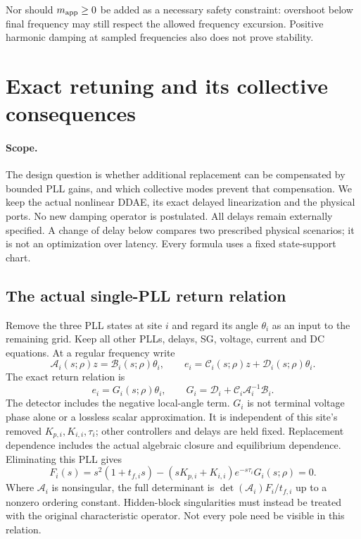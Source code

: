 \documentclass[11pt]{article}
\begin{document}
Nor should $m_{\rm app}\geq0$ be added as a necessary safety
constraint: overshoot below final frequency may still respect the
allowed frequency excursion. Positive harmonic damping at sampled
frequencies also does not prove stability.

\section{Exact retuning and its collective consequences}\label{sec:retuning}

\paragraph{Scope.}
The design question is whether additional replacement can be compensated
by bounded PLL gains, and which collective modes prevent that compensation.
We keep the actual nonlinear DDAE, its exact delayed linearization and
the physical ports. No new damping operator is postulated.
All delays remain externally specified. A change of delay below compares
two prescribed physical scenarios; it is not an optimization over latency.
Every formula uses a fixed state-support chart.

\subsection{The actual single-PLL return relation}
Remove the three PLL states at site $i$ and regard its angle $\theta_i$
as an input to the remaining grid. Keep all other PLLs, delays, SG,
voltage, current and DC equations. At a regular frequency write
\[
 \mathcal A_i(s;\rho)z=\mathcal B_i(s;\rho)\theta_i,\qquad
 e_i=\mathcal C_i(s;\rho)z+\mathcal D_i(s;\rho)\theta_i .
\]
The exact return relation is
\begin{equation}
 e_i=G_i(s;\rho)\theta_i,\qquad
 G_i=\mathcal D_i+\mathcal C_i\mathcal A_i^{-1}\mathcal B_i .
 \label{eq:return}
\end{equation}
The detector includes the negative local-angle term. $G_i$ is not
terminal voltage phase alone or a lossless scalar approximation.
It is independent of this site's removed $K_{p,i},K_{i,i},\tau_i$;
other controllers and delays are held fixed. Replacement dependence
includes the actual algebraic closure and equilibrium dependence.
Eliminating this PLL gives
\begin{equation}
 F_i(s)=s^2(1+t_{f,i}s)
 -(sK_{p,i}+K_{i,i})e^{-s\tau_i}G_i(s;\rho)=0 . \label{eq:scalarroot}
\end{equation}
Where $\mathcal A_i$ is nonsingular, the full determinant is
$\det(\mathcal A_i)F_i/t_{f,i}$ up to a nonzero ordering constant.
Hidden-block singularities must instead be treated with the original
characteristic operator. Not every pole need be visible in this relation.
\end{document}
